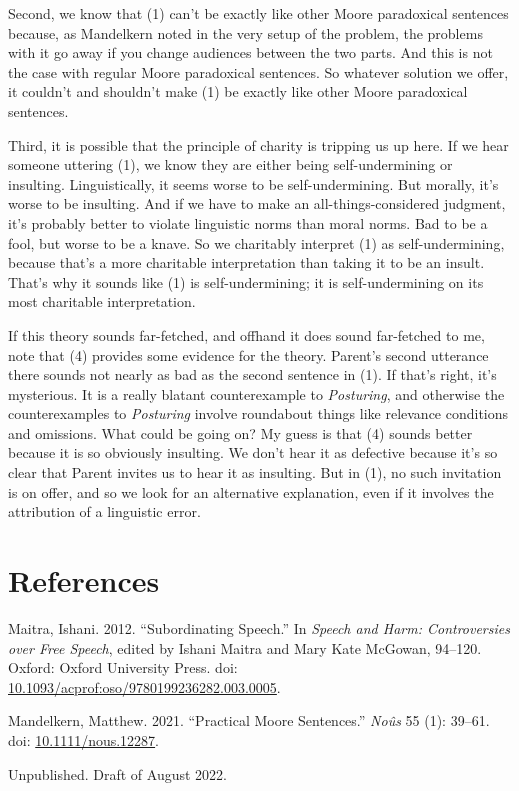 \documentclass[
  11pt,
  letterpaper,
  DIV=11,
  numbers=noendperiod,
  twoside]{scrartcl}
\newlength{\cslhangindent}
\newenvironment{CSLReferences}[2] %
 {\begin{list}{}{%
  \setlength{\itemindent}{0pt}
  \setlength{\leftmargin}{0pt}
  \setlength{\parsep}{0pt}
  \ifodd #1
   \setlength{\leftmargin}{\cslhangindent}
   \setlength{\itemindent}{-1\cslhangindent}
  \fi
  \setlength{\itemsep}{#2\baselineskip}}}
 {\end{list}}
\begin{document}
Second, we know that (1) can't be exactly like other Moore paradoxical
sentences because, as Mandelkern noted in the very setup of the problem,
the problems with it go away if you change audiences between the two
parts. And this is not the case with regular Moore paradoxical
sentences. So whatever solution we offer, it couldn't and shouldn't make
(1) be exactly like other Moore paradoxical sentences.

Third, it is possible that the principle of charity is tripping us up
here. If we hear someone uttering (1), we know they are either being
self-undermining or insulting. Linguistically, it seems worse to be
self-undermining. But morally, it's worse to be insulting. And if we
have to make an all-things-considered judgment, it's probably better to
violate linguistic norms than moral norms. Bad to be a fool, but worse
to be a knave. So we charitably interpret (1) as self-undermining,
because that's a more charitable interpretation than taking it to be an
insult. That's why it sounds like (1) is self-undermining; it is
self-undermining on its most charitable interpretation.

If this theory sounds far-fetched, and offhand it does sound far-fetched
to me, note that (4) provides some evidence for the theory. Parent's
second utterance there sounds not nearly as bad as the second sentence
in (1). If that's right, it's mysterious. It is a really blatant
counterexample to \emph{Posturing}, and otherwise the counterexamples to
\emph{Posturing} involve roundabout things like relevance conditions and
omissions. What could be going on? My guess is that (4) sounds better
because it is so obviously insulting. We don't hear it as defective
because it's so clear that Parent invites us to hear it as insulting.
But in (1), no such invitation is on offer, and so we look for an
alternative explanation, even if it involves the attribution of a
linguistic error.

\section*{References}\label{references}

\label{refs}
\begin{CSLReferences}{1}{0}
Maitra, Ishani. 2012. {``Subordinating Speech.''} In \emph{Speech and
Harm: Controversies over Free Speech}, edited by Ishani Maitra and Mary
Kate McGowan, 94--120. Oxford: Oxford University Press. doi:
\href{https://doi.org/10.1093/acprof:oso/9780199236282.003.0005}{10.1093/acprof:oso/9780199236282.003.0005}.

Mandelkern, Matthew. 2021. {``Practical Moore Sentences.''}
\emph{No{û}s} 55 (1): 39--61. doi:
\href{https://doi.org/10.1111/nous.12287}{10.1111/nous.12287}.

\end{CSLReferences}



\noindent Unpublished. Draft of August 2022.
\end{document}
